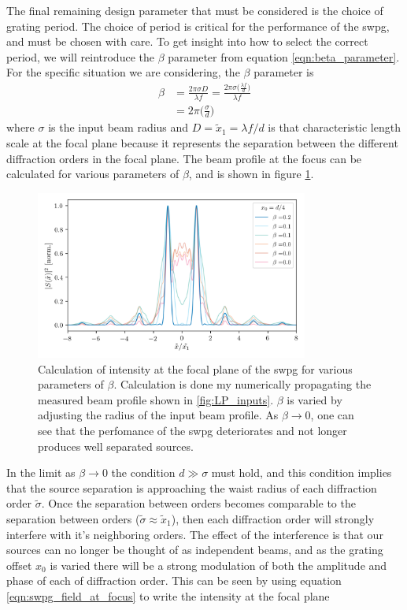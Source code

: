 The final remaining design parameter that must be considered is the choice of grating period. The choice of period is critical for the performance of the \gls{swpg}, and must be chosen with care.  To get insight into how to select the correct period, we will reintroduce the $\beta$ parameter from equation \ref{eqn:beta_parameter}.  For the specific situation we are considering, the $\beta$ parameter is
\begin{equation}
\label{eqn:beta_swpg}
	\begin{aligned}
		\beta &= \frac{2\pi \sigma D}{\lambda f} = \frac{2\pi\sigma\big(\frac{\lambda f}{d}\big)}{\lambda f}\\
		&= 2\pi\bigg(\frac{\sigma}{d}\bigg)
	\end{aligned}
\end{equation}
where $\sigma$ is the input beam radius and $D=\tilde{x}_1=\lambda f /d$ is that characteristic length scale at the focal plane because it represents the separation between the different diffraction orders in the focal plane.  The beam profile at the focus can be calculated for various parameters of $\beta$, and is shown in figure \ref{fig:intensity_vs_beta}.
\begin{figure}
	\centering
	\includegraphics[width=0.8\textwidth]{figures/Two_source/focus_intensity_beta_sigma.png}
	\caption{Calculation of intensity at the focal plane of the \gls{swpg} for various parameters of $\beta$.  Calculation is done my numerically propagating the measured beam profile shown in \ref{fig:LP_inputs}.  $\beta$ is varied by adjusting the radius of the input beam profile.  As $\beta\rightarrow0$, one can see that the perfomance of the \gls{swpg} deteriorates and not longer produces well separated sources.}
	\label{fig:intensity_vs_beta}
\end{figure}
In the limit as $\beta\rightarrow0$ the condition $d\gg\sigma$ must hold, and this condition implies that the source separation is approaching the waist radius of each diffraction order $\tilde{\sigma}$.  Once the separation between orders becomes comparable to the separation between orders ($\tilde{\sigma}\approx\tilde{x}_1$), then each diffraction order will strongly interfere with it's neighboring orders.  The effect of the interference is that our sources can no longer be thought of as independent beams, and as the grating offset $x_0$ is varied there will be a strong modulation of both the amplitude and phase of each of diffraction order.  This can be seen by using equation \ref{eqn:swpg_field_at_focus} to write the intensity at the focal plane

